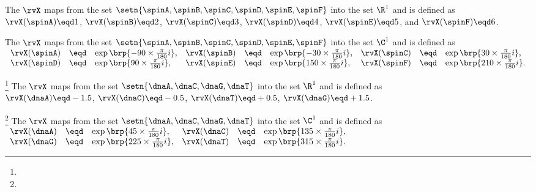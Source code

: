 \begin{definition}
\label{def:rv_spinR1}
The  $\rvX$ maps from the set $\setn{\spinA,\spinB,\spinC,\spinD,\spinE,\spinF}$ into the set $\R^1$
and is defined as\footnotemark
\\\indentx
  $\rvX(\spinA)\eqd 1$, 
  $\rvX(\spinB)\eqd 2$, 
  $\rvX(\spinC)\eqd 3$, 
  $\rvX(\spinD)\eqd 4$, 
  $\rvX(\spinE)\eqd 5$, and 
  $\rvX(\spinF)\eqd 6$.
\end{definition}

\begin{definition}
\label{def:rv_spinqpsk}
The  $\rvX$ maps from the set $\setn{\spinA,\spinB,\spinC,\spinD,\spinE,\spinF}$ into the set $\C^1$
and is defined as 
\\\indentx$\begin{array}{rclrclrcl}
    \rvX(\spinA) &\eqd& \exp\brp{-90\times\frac{\pi}{180}i}, 
   &\rvX(\spinB) &\eqd& \exp\brp{-30\times\frac{\pi}{180}i}, 
   &\rvX(\spinC) &\eqd& \exp\brp{ 30\times\frac{\pi}{180}i}, 
  \\\rvX(\spinD) &\eqd& \exp\brp{ 90\times\frac{\pi}{180}i}, 
   &\rvX(\spinE) &\eqd& \exp\brp{150\times\frac{\pi}{180}i},
   &\rvX(\spinF) &\eqd& \exp\brp{210\times\frac{\pi}{180}i}.
\end{array}$
\end{definition}

\begin{definition}
\footnote{
  }
\label{def:rv_dnapam}
The  $\rvX$ maps from the set $\setn{\dnaA,\dnaC,\dnaG,\dnaT}$ into the set $\R^1$
and is defined as\footnotemark
\\\indentx
  $\rvX(\dnaA)\eqd-1.5$, 
  $\rvX(\dnaC)\eqd-0.5$, 
  $\rvX(\dnaT)\eqd+0.5$, 
  $\rvX(\dnaG)\eqd+1.5$. 
\end{definition}

\begin{definition}
\footnote{
  }
\label{def:rv_dnaqpsk}
The  $\rvX$ maps from the set $\setn{\dnaA,\dnaC,\dnaG,\dnaT}$ into the set $\C^1$
and is defined as 
\\\indentx$\begin{array}{rclrcl}
     \rvX(\dnaA) &\eqd& \exp\brp{ 45\times\frac{\pi}{180}i}, 
    &\rvX(\dnaC) &\eqd& \exp\brp{135\times\frac{\pi}{180}i}, 
   \\\rvX(\dnaG) &\eqd& \exp\brp{225\times\frac{\pi}{180}i}, 
    &\rvX(\dnaT) &\eqd& \exp\brp{315\times\frac{\pi}{180}i}.
\end{array}$
\end{definition}

